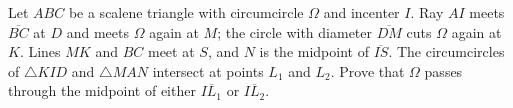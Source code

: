 Let $ABC$ be a scalene triangle with circumcircle $\Omega$ and incenter $I$. Ray $AI$ meets $\overline{BC}$ at $D$ and meets $\Omega$ again at $M$; the circle with diameter $\overline{DM}$ cuts $\Omega$ again at $K$. Lines $MK$ and $BC$ meet at $S$, and $N$ is the midpoint of $\overline{IS}$. The circumcircles of $\triangle KID$ and $\triangle MAN$ intersect at points $L_1$ and $L_2$. Prove that $\Omega$ passes through the midpoint of either $\overline{IL_1}$ or $\overline{IL_2}$.